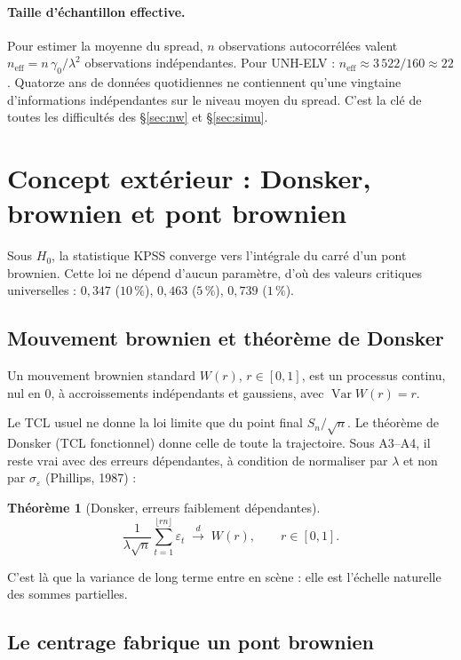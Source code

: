 \documentclass[11pt,a4paper]{article}
\newcommand{\Var}{\operatorname{Var}}
\newcommand{\dto}{\xrightarrow{\;d\;}}
\theoremstyle{definition}
\newtheorem{theo}{Théorème}
\begin{document}
\paragraph{Taille d'échantillon effective.} Pour estimer la moyenne du spread, $n$ observations autocorrélées valent $n_{\text{eff}} = n\,\gamma_0/\lambda^2$ observations indépendantes. Pour UNH-ELV : $n_{\text{eff}} \approx 3\,522/160 \approx 22$. Quatorze ans de données quotidiennes ne contiennent qu'une vingtaine d'informations indépendantes sur le niveau moyen du spread. C'est la clé de toutes les difficultés des \S\ref{sec:nw} et \S\ref{sec:simu}.

\section{Concept extérieur : Donsker, brownien et pont brownien}\label{sec:donsker}

Sous $H_0$, la statistique KPSS converge vers l'intégrale du carré d'un pont brownien. Cette loi ne dépend d'aucun paramètre, d'où des valeurs critiques universelles : $0{,}347$ ($10\,\%$), $0{,}463$ ($5\,\%$), $0{,}739$ ($1\,\%$).

\subsection{Mouvement brownien et théorème de Donsker}

Un mouvement brownien standard $W(r)$, $r \in [0,1]$, est un processus continu, nul en $0$, à accroissements indépendants et gaussiens, avec $\Var W(r) = r$.

Le TCL usuel ne donne la loi limite que du point final $S_n/\sqrt n$. Le théorème de Donsker (TCL fonctionnel) donne celle de toute la trajectoire. Sous A3--A4, il reste vrai avec des erreurs dépendantes, à condition de normaliser par $\lambda$ et non par $\sigma_\varepsilon$ (Phillips, 1987) :

\begin{theo}[Donsker, erreurs faiblement dépendantes]
\[
\frac{1}{\lambda\sqrt n}\sum_{t=1}^{\lfloor rn\rfloor}\varepsilon_t \;\dto\; W(r), \qquad r \in [0,1].
\]
\end{theo}

C'est là que la variance de long terme entre en scène : elle est l'échelle naturelle des sommes partielles.

\subsection{Le centrage fabrique un pont brownien}
\end{document}
